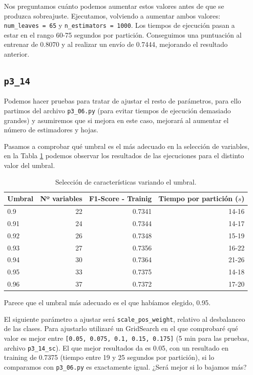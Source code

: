 \documentclass[a4paper, 20pt]{article}
\begin{document}
Nos preguntamos cuánto podemos aumentar estos valores antes de que se produzca sobreajuste. Ejecutamos, volviendo a aumentar ambos valores:  \texttt{num\_leaves = 65} y \texttt{n\_estimators = 1000}. Los tiempos de ejecución pasan a estar en el rango 60-75 segundos por partición. Conseguimos una puntuación al entrenar de 0.8070 y al realizar un envío de 0.7444, mejorando el resultado anterior.

\subsection{\texttt{p3\_14}}

Podemos hacer pruebas para tratar de ajustar el resto de parámetros, para ello partimos del archivo \texttt{p3\_06.py} (para evitar tiempos de ejecución demasiado grandes) y asumiremos que si mejora en este caso, mejorará al aumentar el número de estimadores y hojas.

Pasamos a comprobar qué umbral es el más adecuado en la selección de variables, en la Tabla \ref{tab:14} podemos observar los resultados de las ejecuciones para el distinto valor del umbral.

\begin{table}[H]
\centering
\caption{Selección de características variando el umbral.}
\label{tab:14}
\begin{tabular}{lrrr}
\toprule
Umbral & Nº variables & F1-Score - Trainig & Tiempo por partición ($s$)\\
\midrule
0.9 & 22 & 0.7341 & 14-16\\
0.91 & 24 & 0.7344 & 14-17 \\
0.92 & 26 & 0.7348 & 15-19 \\
0.93 & 27 & 0.7356 & 16-22 \\  
0.94 & 30 & 0.7364 & 21-26 \\
0.95 & 33 & 0.7375 & 14-18\\
0.96 & 37 & 0.7372 & 17-20\\ 
\bottomrule
\end{tabular}
\end{table}

Parece que el umbral más adecuado es el que habíamos elegido, 0.95.

El siguiente parámetro a ajustar será \texttt{scale\_pos\_weight}, relativo al desbalanceo de las clases. Para ajustarlo utilizaré un GridSearch en el que comprobaré qué valor es mejor entre \texttt{[0.05, 0.075, 0.1, 0.15, 0.175]} (5 min para las pruebas, archivo \texttt{p3\_14\_sc}). El que mejor resultados da es 0.05, con un resultado en training de 0.7375 (tiempo entre 19 y 25 segundos por partición), si lo comparamos con \texttt{p3\_06.py} es exactamente igual. ¿Será mejor si lo bajamos más?
\end{document}
